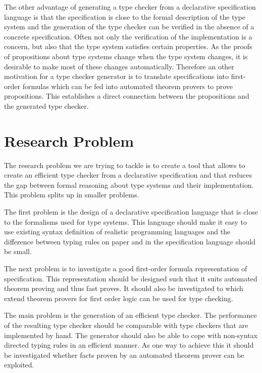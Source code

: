\documentclass{acm_proc_article-sp}
\begin{document}
The other advantage of generating a type checker from a declarative
specification language is that the specification is close to the
formal description of the type system and the generation of the type
checker can be verified in the absence of a concrete
specification. Often not only the verification of the implementation
is a concern, but also that the type system satisfies certain
properties. As the proofs of propositions about type systems change
when the type system changes, it is desirable to make most of these
changes automatically. Therefore an other motivation for a type
checker generator is to translate specifications into first-order
formulas which can be fed into automated theorem provers to prove
propositions. This establishes a direct connection between the
propositions and the generated type checker.


\section{Research Problem}
The research problem we are trying to tackle is to create a tool that
allows to create an efficient type checker from a declarative
specification and that reduces the gap between formal reasoning about
type systems and their implementation. This problem splits up in
smaller problems.

The first problem is the design of a declarative specification
language that is close to the formalisms used for type systems. This
language should make it easy to use existing syntax definition of
realistic programming languages and the difference between typing
rules on paper and in the specification language should be small.

The next problem is to investigate a good first-order formula
representation of specification. This representation should be
designed such that it suits automated theorem proving and thus fast
proves. It should also be investigated to which extend theorem provers
for first order logic can be used for type checking.

The main problem is the generation of an efficient type checker. The
performance of the resulting type checker should be comparable with
type checkers that are implemented by hand. The generator should also
be able to cope with non-syntax directed typing rules in an efficient
manner. As one way to achieve this it should be investigated whether
facts proven by an automated theorem prover can be exploited.
\end{document}
